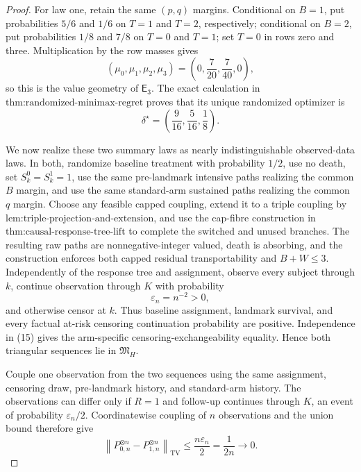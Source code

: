 \documentclass{article}
\begin{document}
\begin{proof}
For law one, retain the same \((p,q)\) margins.  Conditional on \(B=1\), put probabilities \(5/6\) and \(1/6\) on \(T=1\) and \(T=2\), respectively; conditional on \(B=2\), put probabilities \(1/8\) and \(7/8\) on \(T=0\) and \(T=1\); set \(T=0\) in rows zero and three.  Multiplication by the row masses gives
\[
 (\mu_0,\mu_1,\mu_2,\mu_3)
 =\left(0,\frac7{20},\frac7{40},0\right),               \tag{13}
\]
so this is the value geometry of \(\mathsf E_3\).  The exact calculation in \(\text{thm:randomized-minimax-regret}\) proves that its unique randomized optimizer is
\[
 \delta^\star=\left(\frac9{16},\frac5{16},\frac18\right). \tag{14}
\]

We now realize these two summary laws as nearly indistinguishable observed-data laws.  In both, randomize baseline treatment with probability \(1/2\), use no death, set \(S_k^0=S_k^1=1\), use the same pre-landmark intensive paths realizing the common \(B\) margin, and use the same standard-arm sustained paths realizing the common \(q\) margin.  Choose any feasible capped coupling, extend it to a triple coupling by \(\text{lem:triple-projection-and-extension}\), and use the cap-fibre construction in \(\text{thm:causal-response-tree-lift}\) to complete the switched and unused branches.  The resulting raw paths are nonnegative-integer valued, death is absorbing, and the construction enforces both capped residual transportability and \(B+W\le3\).  Independently of the response tree and assignment, observe every subject through \(k\), continue observation through \(K\) with probability
\[
 \varepsilon_n=n^{-2}>0,                                \tag{15}
\]
and otherwise censor at \(k\).  Thus baseline assignment, landmark survival, and every factual at-risk censoring continuation probability are positive.  Independence in (15) gives the arm-specific censoring-exchangeability equality.  Hence both triangular sequences lie in \(\mathfrak M_H\).

Couple one observation from the two sequences using the same assignment, censoring draw, pre-landmark history, and standard-arm history.  The observations can differ only if \(R=1\) and follow-up continues through \(K\), an event of probability \(\varepsilon_n/2\).  Coordinatewise coupling of \(n\) observations and the union bound therefore give
\[
 \left\|P_{0,n}^{\otimes n}-P_{1,n}^{\otimes n}\right\|_{\mathrm{TV}}
 \le \frac{n\varepsilon_n}{2}
 =\frac1{2n}\longrightarrow0.                           \tag{16}
\]


\end{proof}
\end{document}
